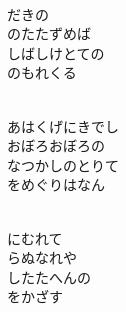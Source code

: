 \documentclass[10pt,b5j]{tarticle} %
\begin{document}
\vspace{1.5em} %
\newcommand{\linespace}{0.5em} %
\newcommand{\blocksize}{0.5\hsize} %
\newcommand{\itemmargin}{3em} %
\begin{enumerate} %
    \setlength{\itemindent}{\itemmargin} %
    \begin{minipage}[c]{\blocksize}
    
        \vspace{\linespace}
        \item~\\
        だきの\\
        のたたずめば\\
        しばしけとての\\
        のもれくる
        
    \end{minipage}
    \begin{minipage}[c]{\blocksize}
        
        \vspace{\linespace}
        \item~\\
        あはくげにきでし\\
        おぼろおぼろの\\
        なつかしのとりて\\
        をめぐりはなん
        
    \end{minipage}
    \begin{minipage}[c]{\blocksize}
        
        \vspace{\linespace}
        \item~\\
        にむれて\\
        らぬなれや\\
        したたへんの\\
        をかざす
        

\end{minipage}
\end{enumerate}
\end{document}
